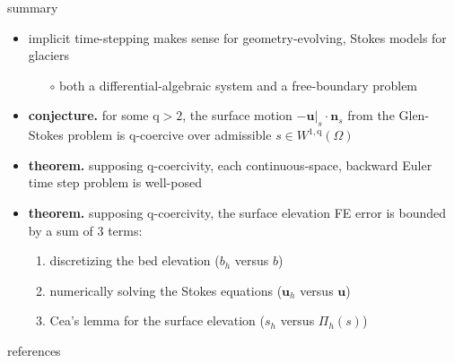 \documentclass[10pt,svgnames]{beamer}
\newcommand{\bn}{\mathbf{n}}
\newcommand{\bu}{\mathbf{u}}
\newcommand{\qq}{\mathrm{q}}
\begin{document}
\begin{frame}{summary}
\begin{itemize}
\item implicit time-stepping makes sense for geometry-evolving, Stokes models for glaciers
    \begin{itemize}
    \item[$\circ$] both a differential-algebraic system and a free-boundary problem
    \end{itemize}
\item \textbf{conjecture.} for some $\qq>2$, the surface motion $-\bu|_s\cdot \bn_s$ from the Glen-Stokes problem is $\qq$-coercive over admissible $s\in W^{1,\qq}(\Omega)$
\item \textbf{theorem.} supposing $\qq$-coercivity, each continuous-space, backward Euler time step problem is well-posed
\item \textbf{theorem.} supposing $\qq$-coercivity, the surface elevation FE error is bounded by a sum of 3 terms:
    \begin{enumerate}
    \item discretizing the bed elevation ($b_h$ versus $b$)
    \item numerically solving the Stokes equations ($\bu_h$ versus $\bu$)
    \item Cea's lemma for the surface elevation ($s_h$ versus $\Pi_h(s)$) \strut
    \end{enumerate}
\end{itemize}
\end{frame}


\begin{frame}{references}

{\footnotesize }
\end{frame}
\end{document}
